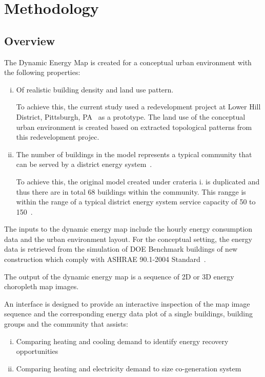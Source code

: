 
\chapter{Methodology} %

\label{Chapter4} %


\section{Overview}
The Dynamic Energy Map is created for a conceptual urban environment
with the following properties:
\begin{enumerate}[i.]
\item Of realistic building density and land use pattern.
  
  To achieve this, the current study used a redevelopment project at
  Lower Hill District, Pittsburgh, PA~\cite{Ramesh2013} as a
  prototype.  The land use of the conceptual urban environment is
  created based on extracted topological patterns from this
  redevelopment projec.

\item The number of buildings in the model represents a typical
  community that can be served by a district energy
  system~\cite{IDEA2012}.
  
  To achieve this, the original model created under crateria i. is
  duplicated and thus there are in total 68 buildings within the
  community. This rangge is within the range of a typical district
  energy system service capacity of 50 to 150~\cite{IDEA2012}.

\end{enumerate}

The inputs to the dynamic energy map include the hourly energy
consumption data and the urban environment layout. For the conceptual
setting, the energy data is retrieved from the simulation of DOE
Benchmark buildings of new construction which comply with ASHRAE
90.1-2004 Standard~\cite{DOE2015}.

The output of the dynamic energy map is a sequence of 2D or 3D energy
choropleth map images.

An interface is designed to provide an interactive inspection of the
map image sequence and the corresponding energy data plot of a single
buildings, building groups and the community that assists:
\begin{enumerate}[i.]
\item Comparing heating and cooling demand to identify energy recovery
  opportunities
\item Comparing heating and electricity demand to size co-generation
  system
\end{enumerate}

